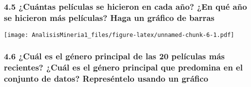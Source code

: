 \documentclass[
]{article}
\newenvironment{Shaded}{\begin{snugshade}}{\end{snugshade}}
\newcommand{\AttributeTok}[1]{\textcolor[rgb]{0.77,0.63,0.00}{#1}}
\newcommand{\DecValTok}[1]{\textcolor[rgb]{0.00,0.00,0.81}{#1}}
\newcommand{\FunctionTok}[1]{\textcolor[rgb]{0.00,0.00,0.00}{#1}}
\newcommand{\NormalTok}[1]{#1}
\newcommand{\OtherTok}[1]{\textcolor[rgb]{0.56,0.35,0.01}{#1}}
\newcommand{\SpecialCharTok}[1]{\textcolor[rgb]{0.00,0.00,0.00}{#1}}
\begin{document}
\hypertarget{cuuxe1ntas-peluxedculas-se-hicieron-en-cada-auxf1o-en-quuxe9-auxf1o-se-hicieron-muxe1s-peluxedculas-haga-un-gruxe1fico-de-barras}{%
\subsubsection{4.5 ¿Cuántas películas se hicieron en cada año? ¿En qué
año se hicieron más películas? Haga un gráfico de
barras}\label{cuuxe1ntas-peluxedculas-se-hicieron-en-cada-auxf1o-en-quuxe9-auxf1o-se-hicieron-muxe1s-peluxedculas-haga-un-gruxe1fico-de-barras}}

\begin{Shaded}
\end{Shaded}

\texttt{[image: AnalisisMineria1\_files/figure-latex/unnamed-chunk-6-1.pdf]}

\hypertarget{cuuxe1l-es-el-guxe9nero-principal-de-las-20-peluxedculas-muxe1s-recientes-cuuxe1l-es-el-guxe9nero-principal-que-predomina-en-el-conjunto-de-datos-represuxe9ntelo-usando-un-gruxe1fico}{%
\subsubsection{4.6 ¿Cuál es el género principal de las 20 películas más
recientes? ¿Cuál es el género principal que predomina en el conjunto de
datos? Represéntelo usando un
gráfico}\label{cuuxe1l-es-el-guxe9nero-principal-de-las-20-peluxedculas-muxe1s-recientes-cuuxe1l-es-el-guxe9nero-principal-que-predomina-en-el-conjunto-de-datos-represuxe9ntelo-usando-un-gruxe1fico}}
\end{document}

